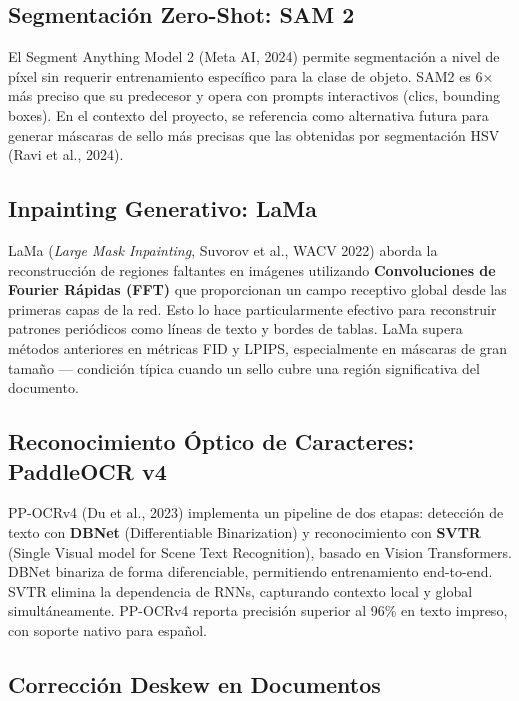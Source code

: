 \documentclass[11pt, a4paper]{article}
\begin{document}
\subsection{Segmentación Zero-Shot: SAM 2}

El Segment Anything Model 2 (Meta AI, 2024) permite segmentación a nivel de píxel sin requerir entrenamiento específico para la clase de objeto. SAM2 es 6× más preciso que su predecesor y opera con prompts interactivos (clics, bounding boxes). En el contexto del proyecto, se referencia como alternativa futura para generar máscaras de sello más precisas que las obtenidas por segmentación HSV (Ravi et al., 2024).

\subsection{Inpainting Generativo: LaMa}

LaMa (\textit{Large Mask Inpainting}, Suvorov et al., WACV 2022) aborda la reconstrucción de regiones faltantes en imágenes utilizando \textbf{Convoluciones de Fourier Rápidas (FFT)} que proporcionan un campo receptivo global desde las primeras capas de la red. Esto lo hace particularmente efectivo para reconstruir patrones periódicos como líneas de texto y bordes de tablas. LaMa supera métodos anteriores en métricas FID y LPIPS, especialmente en máscaras de gran tamaño --- condición típica cuando un sello cubre una región significativa del documento.

\subsection{Reconocimiento Óptico de Caracteres: PaddleOCR v4}

PP-OCRv4 (Du et al., 2023) implementa un pipeline de dos etapas: detección de texto con \textbf{DBNet} (Differentiable Binarization) y reconocimiento con \textbf{SVTR} (Single Visual model for Scene Text Recognition), basado en Vision Transformers. DBNet binariza de forma diferenciable, permitiendo entrenamiento end-to-end. SVTR elimina la dependencia de RNNs, capturando contexto local y global simultáneamente. PP-OCRv4 reporta precisión superior al 96\% en texto impreso, con soporte nativo para español.

\subsection{Corrección Deskew en Documentos}
\end{document}
